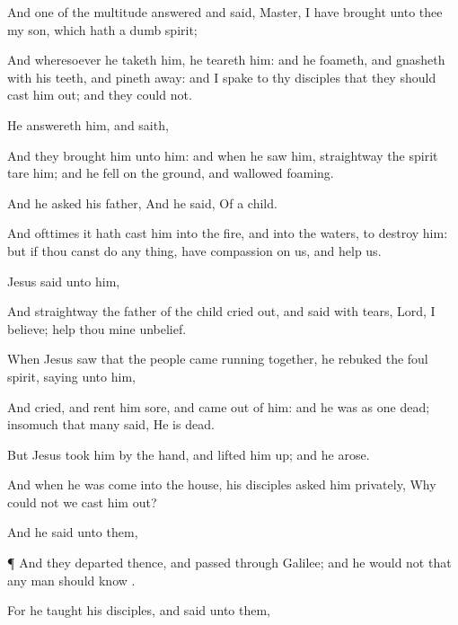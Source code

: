 {And
one
of the
multitude
answered and
said,
Master, I have
brought
unto
thee
my
son, which
hath
a
dumb
spirit;

And
wheresoever he
taketh
him, he
teareth
him:
and he
foameth,
and
gnasheth
with
his
teeth,
and pineth
away:
and I
spake
to
thy
disciples
that they should
cast
him
out;
and they
could
not.

He
answereth
him,
and
saith,
{}

And they
brought
him
unto
him:
and when he
saw
him,
straightway the
spirit
tare
him;
and he
fell
on the
ground, and
wallowed
foaming.

And he
asked
his
father,
{}
And he
said, Of a
child.

And
ofttimes it hath
cast
him
into the
fire,
and
into the
waters,
to
destroy
him:
but
if thou canst
do any
thing, have
compassion
on
us, and
help
us.

Jesus
said unto
him,
{}

And
straightway the
father of the
child cried
out, and
said
with
tears,
Lord, I
believe; help
thou
mine
unbelief.

When
Jesus
saw
that the
people came running
together, he
rebuked
the
foul
spirit,
saying unto
him,
{}

And
{}
cried,
and
rent
him
sore, and came
out of him:
and he
was
as one
dead; insomuch
that
many
said, He is
dead.

But
Jesus
took
him by the
hand, and
lifted
him
up;
and he
arose.

And
when he was
come
into the
house,
his
disciples
asked
him
privately,
Why
could
not
we
cast
him
out?

And he
said unto
them,
{}


\par }{\PP {}¶
And they
departed
thence, and
passed
through
Galilee;
and he
would
not
that any
man should
know
{}.

For he
taught
his
disciples,
and
said unto
them,
{}

}

